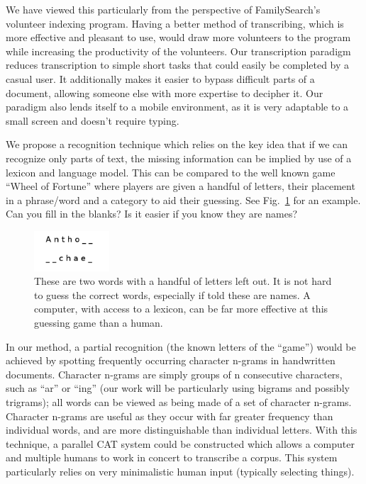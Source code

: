 \documentclass[ms]{byuprop}
\begin{document}
We have viewed this particularly from the perspective of FamilySearch's volunteer indexing program. Having a better method of transcribing, which is more effective and pleasant to use, would  draw more volunteers to the program while increasing the productivity of the volunteers. Our transcription paradigm reduces transcription to simple short tasks that could easily be completed by a casual user. It additionally makes it easier to bypass difficult parts of a document, allowing someone else with more expertise to decipher it. Our paradigm also lends itself to a mobile environment, as it is very adaptable to a small screen and doesn't require typing.


We propose a recognition technique which relies on the key idea that if we can recognize only parts of text, the missing information can be implied by use of a lexicon and language model. This can be compared to the well known game ``Wheel of Fortune'' where players are given a handful of letters, their placement in a phrase/word and a category to aid their guessing. See Fig.~\ref{fig:wheel_of_fortune_example} for an example. Can you fill in the blanks? Is it easier if you know they are names?

\begin{figure}[h]
    \centering
    \includegraphics[width=0.25\textwidth]{wheel_of_fortune_example}
    \caption{These are two words with a handful of letters left out. It is not hard to guess the correct words, especially if told these are names. A computer, with access to a lexicon, can be far more effective at this guessing game than a human.}
    \label{fig:wheel_of_fortune_example}
\end{figure}

In our method, a partial recognition (the known letters of the ``game'') would be achieved by spotting frequently occurring character n-grams in handwritten documents. Character n-grams are simply groups of n consecutive characters, such as ``ar'' or ``ing'' (our work will be particularly using bigrams and possibly trigrams); all words can be viewed as being made of a set of character n-grams. Character n-grams are useful as they occur with far greater frequency than individual words, and are more distinguishable than individual letters. With this technique, a parallel CAT system could be constructed which allows a computer and multiple humans to work in concert to transcribe a corpus. This system particularly relies on very minimalistic human input (typically selecting things).
\end{document}
